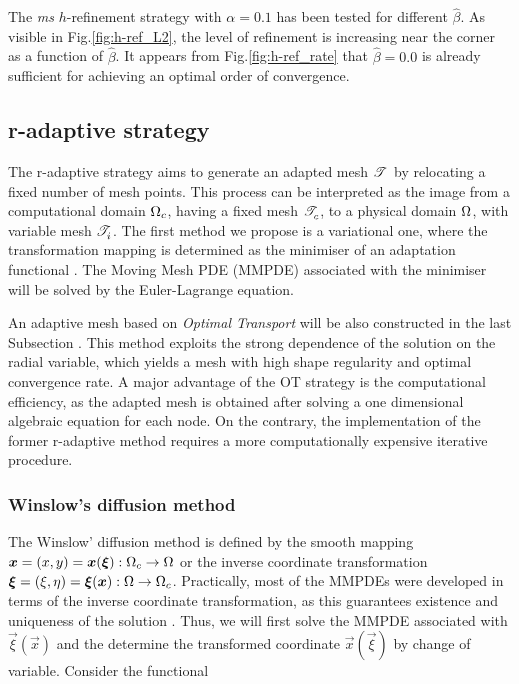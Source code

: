 \documentclass[a4paper,11pt]{article}
\begin{document}
{The \textit{ms} $h$-refinement strategy with $\alpha = 0.1$ has been tested for different $\hat{\beta}$. As visible in Fig.\ref{fig:h-ref_L2}, the level of refinement is increasing near the corner as a function of $\hat{\beta}$. It appears from Fig.\ref{fig:h-ref_rate} that $\hat{\beta} = 0.0$ is already sufficient for achieving an optimal order of convergence.

\clearpage
\newpage


\subsection{r-adaptive strategy}
\label{sec:r-adaptive}
The r-adaptive strategy aims to generate an adapted mesh $\mathscr T^{}$ by relocating a fixed number of mesh points. This process can be interpreted as the image from a computational domain $\Omega_{c}$, having a fixed mesh $\mathscr T^{}_{c}$, to a physical domain $\Omega$, with variable mesh $\mathscr T^{}_{i}$. The first method we propose is a variational one, where the transformation mapping is determined as the minimiser of an adaptation functional \cite{BHR:2009,Winslow:1966}. The Moving Mesh PDE (MMPDE) associated with the minimiser will be solved by the Euler-Lagrange equation.


An adaptive mesh based on \textit{Optimal Transport} will be also constructed in the last Subsection \cite{BHR:2009}. This method exploits the strong dependence of the solution on the radial variable, which yields a mesh with high shape regularity and optimal convergence rate. A major advantage of the OT strategy is the computational efficiency, as the adapted mesh is obtained after solving a one dimensional algebraic equation for each node. On the contrary, the implementation of the former r-adaptive method requires a more computationally expensive iterative procedure. 

\subsubsection{Winslow's diffusion method}
\label{sec:Wins}
The Winslow' diffusion method is defined by the smooth mapping $\boldsymbol x = (x,y) = \boldsymbol x(\boldsymbol \xi) : \Omega_{c} \rightarrow \Omega$ or the inverse coordinate
transformation $\boldsymbol \xi = (\xi,\eta) =  \boldsymbol \xi(\boldsymbol x) : \Omega \rightarrow
\Omega_{c}$. Practically, most of the MMPDEs were developed in terms of
the inverse coordinate transformation, as this guarantees existence
and uniqueness of the solution \cite{Winslow:1966,Dvinsky:1991}. Thus, we will first solve the MMPDE associated with $\vec{\xi}(\vec{x})$ and the determine the transformed coordinate $\vec{x}(\vec{\xi})$ by change of variable. Consider the functional

}
\end{document}

